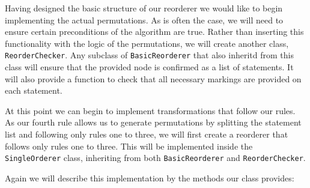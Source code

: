 \documentclass{report}
\begin{document}
Having designed the basic structure of our reorderer we would like to begin implementing the actual permutations. As is often the case, we will need to
ensure certain preconditions of the algorithm are true. Rather than inserting this functionality with the logic of the permutations, we will create
another class, \texttt{ReorderChecker}. Any subclass of \texttt{BasicReorderer} that also inheritd from this class will ensure that the provided node
is confirmed as a list of statements. It will also provide a function to check that all necessary markings are provided on each statement.

At this point we can begin to implement transformations that follow our rules. As our fourth rule allows us to generate permutations by splitting the
statement list and following only rules one to three, we will first create a reorderer that follows only rules one to three. This will be implemented
inside the \texttt{SingleOrderer} class, inheriting from both \texttt{BasicReorderer} and \texttt{ReorderChecker}.

Again we will describe this implementation by the methods our class provides:
\end{document}
